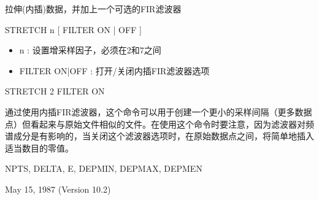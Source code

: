 \label{cmd:stretch}

拉伸(内插)数据，并加上一个可选的FIR滤波器

STRETCH  n [ FILTER ON | OFF ]

\begin{itemize}
\item n : 设置增采样因子，必须在2和7之间 
\item FILTER ON|OFF : 打开/关闭内插FIR滤波器选项 
\end{itemize}

STRETCH 2 FILTER ON

通过使用内插FIR滤波器，这个命令可以用于创建一个更小的采样间隔（更多数据点）但看起来与原始文件相似的文件。在使用这个命令时要注意，因为滤波器对频谱成分是有影响的，当关闭这个滤波器选项时，在原始数据点之间，将简单地插入适当数目的零值。

NPTS, DELTA, E, DEPMIN, DEPMAX, DEPMEN

May 15, 1987 (Version 10.2)

